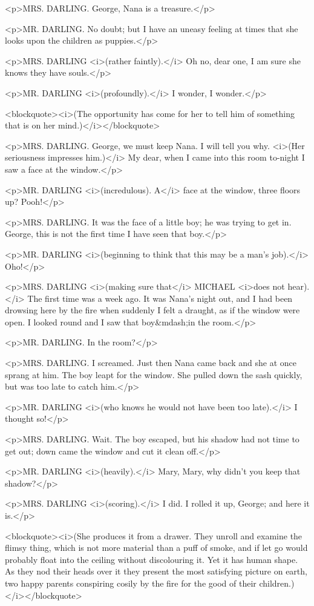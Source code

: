 <p>MRS. DARLING. George, Nana is a treasure.</p>

<p>MR. DARLING. No doubt; but I have an uneasy feeling at times that
she looks upon the children as puppies.</p>

<p>MRS. DARLING <i>(rather faintly).</i> Oh no, dear one, I am sure
she knows they have souls.</p>

<p>MR. DARLING <i>(profoundly).</i> I wonder, I wonder.</p>

<blockquote><i>(The opportunity has come for her to tell him of
something that is on her mind.)</i></blockquote>

<p>MRS. DARLING. George, we must keep Nana. I will tell you why.
<i>(Her seriousness impresses him.)</i> My dear, when I came into
this room to-night I saw a face at the window.</p>

<p>MR. DARLING <i>(incredulous). A</i> face at the window, three
floors up? Pooh!</p>

<p>MRS. DARLING. It was the face of a little boy; he was trying to
get in. George, this is not the first time I have seen that boy.</p>

<p>MR. DARLING <i>(beginning to think that this may be a man's
job).</i> Oho!</p>

<p>MRS. DARLING <i>(making sure that</i> MICHAEL <i>does not
hear).</i> The first time was a week ago. It was Nana's night out,
and I had been drowsing here by the fire when suddenly I felt a
draught, as if the window were open. I looked round and I saw that
boy&mdash;in the room.</p>

<p>MR. DARLING. In the room?</p>

<p>MRS. DARLING. I screamed. Just then Nana came back and she at once
sprang at him. The boy leapt for the window. She pulled down the sash
quickly, but was too late to catch him.</p>

<p>MR. DARLING <i>(who knows he would not have been too late).</i> I
thought so!</p>

<p>MRS. DARLING. Wait. The boy escaped, but his shadow had not time
to get out; down came the window and cut it clean off.</p>

<p>MR. DARLING <i>(heavily).</i> Mary, Mary, why didn't you keep that
shadow?</p>

<p>MRS. DARLING <i>(scoring).</i> I did. I rolled it up, George; and
here it is.</p>

<blockquote><i>(She produces it from a drawer. They unroll and
examine the flimsy thing, which is not more material than a puff of
smoke, and if let go would probably float into the ceiling without
discolouring it. Yet it has human shape. As they nod their heads over
it they present the most satisfying picture on earth, two happy
parents conspiring cosily by the fire for the good of their
children.)</i></blockquote>

